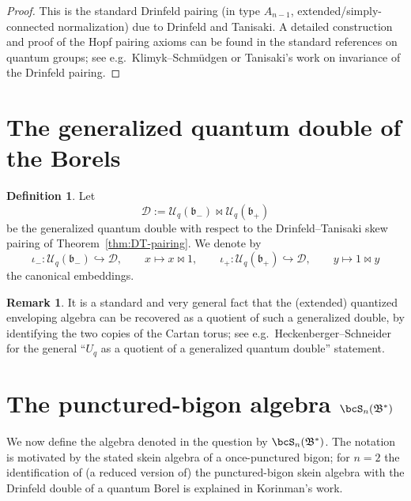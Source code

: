 \documentclass[11pt]{article}
\theoremstyle{definition}
\newtheorem{definition}{Definition}
\newtheorem{remark}{Remark}
\newcommand{\Uc}{\mathcal{U}}
\newcommand{\fb}{\mathfrak{b}}
\newcommand{\bipr}{\bowtie}
\begin{document}
\begin{proof}
This is the standard Drinfeld pairing (in type $A_{n-1}$, extended/simply-connected normalization) due to Drinfeld and Tanisaki. A detailed construction and proof of the Hopf pairing axioms can be found in the standard references on quantum groups; see e.g.\ Klimyk--Schm\"udgen or Tanisaki's work on invariance of the Drinfeld pairing.
\end{proof}


\section{The generalized quantum double of the Borels}

\begin{definition}
Let
\[
\mathcal{D}:=\Uc_q(\fb_-)\bipr \Uc_q(\fb_+)
\]
be the generalized quantum double with respect to the Drinfeld--Tanisaki skew pairing of Theorem~\ref{thm:DT-pairing}.
We denote by
\[
\iota_-:\Uc_q(\fb_-)\hookrightarrow \mathcal{D},\qquad x\mapsto x\bipr 1,
\qquad
\iota_+:\Uc_q(\fb_+)\hookrightarrow \mathcal{D},\qquad y\mapsto 1\bipr y
\]
the canonical embeddings.
\end{definition}

\begin{remark}
It is a standard and very general fact that the (extended) quantized enveloping algebra can be recovered as a quotient of such a generalized double, by identifying the two copies of the Cartan torus; see e.g.\ Heckenberger--Schneider for the general ``$U_q$ as a quotient of a generalized quantum double'' statement.  %
\end{remark}


\section{The punctured-bigon algebra $\bcS_n(\mathfrak B^*)$}

We now define the algebra denoted in the question by $\bcS_n(\mathfrak B^*)$. The notation is motivated by the stated skein algebra of a once-punctured bigon; for $n=2$ the identification of (a reduced version of) the punctured-bigon skein algebra with the Drinfeld double of a quantum Borel is explained in Korinman's work.  %
\end{document}
